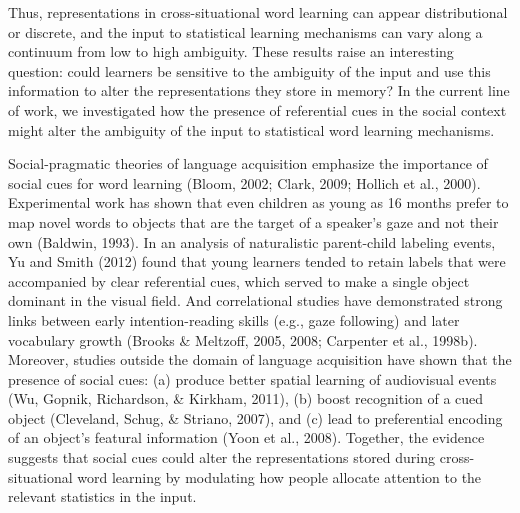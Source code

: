 \documentclass[oneside]{report}
\begin{document}
Thus, representations in cross-situational word learning can appear
distributional or discrete, and the input to statistical learning
mechanisms can vary along a continuum from low to high ambiguity. These
results raise an interesting question: could learners be sensitive to
the ambiguity of the input and use this information to alter the
representations they store in memory? In the current line of work, we
investigated how the presence of referential cues in the social context
might alter the ambiguity of the input to statistical word learning
mechanisms.

Social-pragmatic theories of language acquisition emphasize the
importance of social cues for word learning (Bloom, 2002; Clark, 2009;
Hollich et al., 2000). Experimental work has shown that even children as
young as 16 months prefer to map novel words to objects that are the
target of a speaker's gaze and not their own (Baldwin, 1993). In an
analysis of naturalistic parent-child labeling events, Yu and Smith
(2012) found that young learners tended to retain labels that were
accompanied by clear referential cues, which served to make a single
object dominant in the visual field. And correlational studies have
demonstrated strong links between early intention-reading skills (e.g.,
gaze following) and later vocabulary growth (Brooks \& Meltzoff, 2005,
2008; Carpenter et al., 1998b). Moreover, studies outside the domain of
language acquisition have shown that the presence of social cues: (a)
produce better spatial learning of audiovisual events (Wu, Gopnik,
Richardson, \& Kirkham, 2011), (b) boost recognition of a cued object
(Cleveland, Schug, \& Striano, 2007), and (c) lead to preferential
encoding of an object's featural information (Yoon et al., 2008).
Together, the evidence suggests that social cues could alter the
representations stored during cross-situational word learning by
modulating how people allocate attention to the relevant statistics in
the input.
\end{document}
